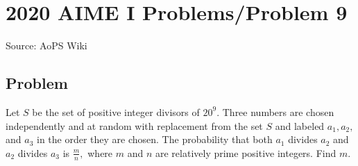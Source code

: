 \documentclass[12pt]{article}
\begin{document}
\section*{{2020 AIME I Problems/Problem 9}}
Source: AoPS Wiki

\subsection*{Problem}
Let $S$ be the set of positive integer divisors of $20^9.$ Three numbers are chosen independently and at random with replacement from the set $S$ and labeled $a_1,a_2,$ and $a_3$ in the order they are chosen. The probability that both $a_1$ divides $a_2$ and $a_2$ divides $a_3$ is $\tfrac{m}{n},$ where $m$ and $n$ are relatively prime positive integers. Find $m.$
\end{document}
